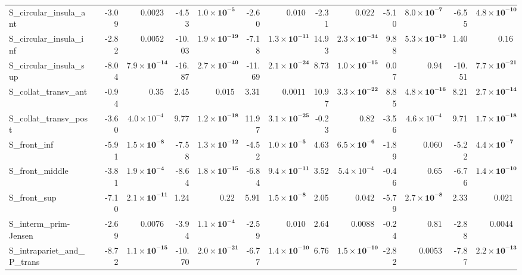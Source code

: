{\begin{longtable}{llrrrrrrrrrrrr}
S\_circular\_insula\_ant &  & -3.09 & $0.0023$ & -4.53 & $\mathbf{1.0{\times}10^{-5}}$ & -2.60 & $0.010$ & -2.31 & $0.022$ & -5.10 & $\mathbf{8.0{\times}10^{-7}}$ & -6.55 & $\mathbf{4.8{\times}10^{-10}}$ \\
S\_circular\_insula\_inf &  & -2.82 & $0.0052$ & -10.03 & $\mathbf{1.9{\times}10^{-19}}$ & -7.18 & $\mathbf{1.3{\times}10^{-11}}$ & 14.93 & $\mathbf{2.3{\times}10^{-34}}$ & 9.88 & $\mathbf{5.3{\times}10^{-19}}$ & 1.40 & $0.16$ \\
S\_circular\_insula\_sup &  & -8.04 & $\mathbf{7.9{\times}10^{-14}}$ & -16.87 & $\mathbf{2.7{\times}10^{-40}}$ & -11.69 & $\mathbf{2.1{\times}10^{-24}}$ & 8.73 & $\mathbf{1.0{\times}10^{-15}}$ & 0.07 & $0.94$ & -10.51 & $\mathbf{7.7{\times}10^{-21}}$ \\
S\_collat\_transv\_ant &  & -0.94 & $0.35$ & 2.45 & $0.015$ & 3.31 & $0.0011$ & 10.97 & $\mathbf{3.3{\times}10^{-22}}$ & 8.85 & $\mathbf{4.8{\times}10^{-16}}$ & 8.21 & $\mathbf{2.7{\times}10^{-14}}$ \\
S\_collat\_transv\_post &  & -3.60 & $4.0{\times}10^{-4}$ & 9.77 & $\mathbf{1.2{\times}10^{-18}}$ & 11.97 & $\mathbf{3.1{\times}10^{-25}}$ & -0.23 & $0.82$ & -3.56 & $4.6{\times}10^{-4}$ & 9.71 & $\mathbf{1.7{\times}10^{-18}}$ \\
S\_front\_inf &  & -5.91 & $\mathbf{1.5{\times}10^{-8}}$ & -7.58 & $\mathbf{1.3{\times}10^{-12}}$ & -4.52 & $\mathbf{1.0{\times}10^{-5}}$ & 4.63 & $\mathbf{6.5{\times}10^{-6}}$ & -1.89 & $0.060$ & -5.22 & $\mathbf{4.4{\times}10^{-7}}$ \\
S\_front\_middle &  & -3.81 & $\mathbf{1.9{\times}10^{-4}}$ & -8.64 & $\mathbf{1.8{\times}10^{-15}}$ & -6.84 & $\mathbf{9.4{\times}10^{-11}}$ & 3.52 & $5.4{\times}10^{-4}$ & -0.46 & $0.65$ & -6.76 & $\mathbf{1.4{\times}10^{-10}}$ \\
S\_front\_sup &  & -7.10 & $\mathbf{2.1{\times}10^{-11}}$ & 1.24 & $0.22$ & 5.91 & $\mathbf{1.5{\times}10^{-8}}$ & 2.05 & $0.042$ & -5.79 & $\mathbf{2.7{\times}10^{-8}}$ & 2.33 & $0.021$ \\
S\_interm\_prim-Jensen &  & -2.69 & $0.0076$ & -3.94 & $\mathbf{1.1{\times}10^{-4}}$ & -2.59 & $0.010$ & 2.64 & $0.0088$ & -0.24 & $0.81$ & -2.88 & $0.0044$ \\
S\_intrapariet\_and\_P\_trans &  & -8.72 & $\mathbf{1.1{\times}10^{-15}}$ & -10.70 & $\mathbf{2.0{\times}10^{-21}}$ & -6.77 & $\mathbf{1.4{\times}10^{-10}}$ & 6.76 & $\mathbf{1.5{\times}10^{-10}}$ & -2.82 & $0.0053$ & -7.87 & $\mathbf{2.2{\times}10^{-13}}$ \\

\end{longtable}}
